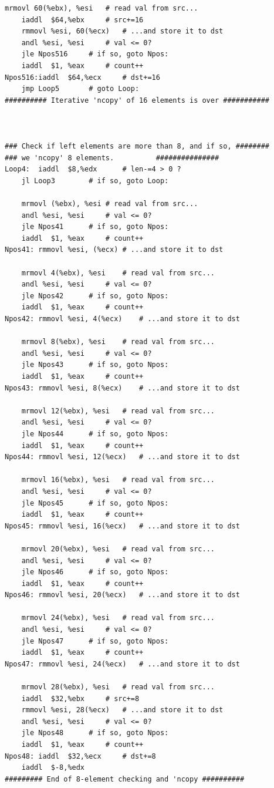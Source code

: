 \documentclass{article}
\begin{document}
\begin{itemize}
\begin{lstlisting}[caption={}]
	mrmovl 60(%ebx), %esi	# read val from src...
	iaddl  $64,%ebx		# src+=16
	rmmovl %esi, 60(%ecx)	# ...and store it to dst
	andl %esi, %esi		# val <= 0?
	jle Npos516		# if so, goto Npos:
	iaddl  $1, %eax		# count++
Npos516:iaddl  $64,%ecx		# dst+=16
	jmp Loop5		# goto Loop:
########## Iterative 'ncopy' of 16 elements is over ###########



### Check if left elements are more than 8, and if so, ########
### we 'ncopy' 8 elements.			###############
Loop4:	iaddl  $8,%edx		# len-=4 > 0 ?
	jl Loop3		# if so, goto Loop:

	mrmovl (%ebx), %esi	# read val from src...
	andl %esi, %esi		# val <= 0?
	jle Npos41		# if so, goto Npos:
	iaddl  $1, %eax		# count++
Npos41:	rmmovl %esi, (%ecx)	# ...and store it to dst

	mrmovl 4(%ebx), %esi	# read val from src...
	andl %esi, %esi		# val <= 0?
	jle Npos42		# if so, goto Npos:
	iaddl  $1, %eax		# count++
Npos42:	rmmovl %esi, 4(%ecx)	# ...and store it to dst

	mrmovl 8(%ebx), %esi	# read val from src...
	andl %esi, %esi		# val <= 0?
	jle Npos43		# if so, goto Npos:
	iaddl  $1, %eax		# count++
Npos43:	rmmovl %esi, 8(%ecx)	# ...and store it to dst

	mrmovl 12(%ebx), %esi	# read val from src...
	andl %esi, %esi		# val <= 0?
	jle Npos44		# if so, goto Npos:
	iaddl  $1, %eax		# count++
Npos44:	rmmovl %esi, 12(%ecx)	# ...and store it to dst

	mrmovl 16(%ebx), %esi	# read val from src...
	andl %esi, %esi		# val <= 0?
	jle Npos45		# if so, goto Npos:
	iaddl  $1, %eax		# count++
Npos45:	rmmovl %esi, 16(%ecx)	# ...and store it to dst

	mrmovl 20(%ebx), %esi	# read val from src...
	andl %esi, %esi		# val <= 0?
	jle Npos46		# if so, goto Npos:
	iaddl  $1, %eax		# count++
Npos46:	rmmovl %esi, 20(%ecx)	# ...and store it to dst

	mrmovl 24(%ebx), %esi	# read val from src...
	andl %esi, %esi		# val <= 0?
	jle Npos47		# if so, goto Npos:
	iaddl  $1, %eax		# count++
Npos47:	rmmovl %esi, 24(%ecx)	# ...and store it to dst

	mrmovl 28(%ebx), %esi	# read val from src...
	iaddl  $32,%ebx		# src+=8
	rmmovl %esi, 28(%ecx)	# ...and store it to dst
	andl %esi, %esi		# val <= 0?
	jle Npos48		# if so, goto Npos:
	iaddl  $1, %eax		# count++
Npos48:	iaddl  $32,%ecx		# dst+=8
	iaddl  $-8,%edx
######### End of 8-element checking and 'ncopy ##########



\end{lstlisting}
\end{itemize}
\end{document}
